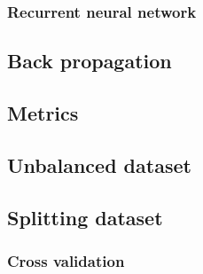 \subsubsection{Recurrent neural network}

\subsection{Back propagation}
\subsection{Metrics}
\subsection{Unbalanced dataset}
\subsection{Splitting dataset}
\subsubsection{Cross validation}


